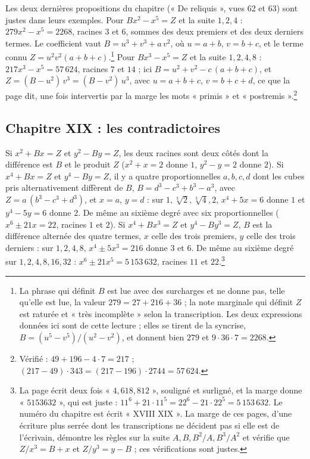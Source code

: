 \documentclass[11pt,a4paper]{article}
\begin{document}
Les deux dernières propositions du chapitre (« De reliquis », vues 62 et 63)
sont justes dans leurs exemples. Pour $Bx^2 - x^5 = Z$ et la suite $1, 2, 4$ :
$279x^2 - x^5 = 2268$, racines $3$ et $6$, sommes des deux premiers et des deux
derniers termes. Le coefficient vaut $B = u^3 + v^3 + a\,v^2$, où $u = a + b$,
$v = b + c$, et le terme connu $Z = u^2v^2(a + b + c)$.\footnote{La phrase qui
définit $B$ est lue avec des surcharges et ne donne pas, telle qu'elle est lue,
la valeur $279 = 27 + 216 + 36$ ; la note marginale qui définit $Z$ est raturée
et « très incomplète » selon la transcription. Les deux expressions données ici
sont de cette lecture ; elles se tirent de la syncrise,
$B = (u^5 - v^5)/(u^2 - v^2)$, et donnent bien $279$ et $9 \cdot 36 \cdot 7 = 2268$.}
Pour $Bx^3 - x^5 = Z$ et la suite $1, 2, 4, 8$ : $217x^3 - x^5 = 57\,624$, racines
$7$ et $14$ ; ici $B = u^2 + v^2 - c\,(a + b + c)$, et $Z = (B - u^2)\,v^3 =
(B - v^2)\,u^3$, avec $u = a + b + c$, $v = b + c + d$, ce que la page dit, une fois
intervertis par la marge les mots « primis » et « postremis ».\footnote{Vérifié :
$49 + 196 - 4 \cdot 7 = 217$ ; $(217 - 49) \cdot 343 = (217 - 196) \cdot 2744 =
57\,624$.}

\subsection*{Chapitre XIX : les contradictoires}

Si $x^2 + Bx = Z$ et $y^2 - By = Z$, les deux racines sont deux côtés dont la
différence est $B$ et le produit $Z$ ($x^2 + x = 2$ donne $1$, $y^2 - y = 2$
donne $2$). Si $x^4 + Bx = Z$ et $y^4 - By = Z$, il y a quatre proportionnelles
$a, b, c, d$ dont les cubes pris alternativement diffèrent de $B$,
$B = d^3 - c^3 + b^3 - a^3$, avec $Z = a\,(b^3 - c^3 + d^3)$, et $x = a$, $y = d$ :
sur $1, \sqrt[3]{2}, \sqrt[3]{4}, 2$, $x^4 + 5x = 6$ donne $1$ et $y^4 - 5y = 6$
donne $2$. De même au sixième degré avec six proportionnelles
($x^6 \pm 21x = 22$, racines $1$ et $2$). Si $x^4 + Bx^3 = Z$ et $y^4 - By^3 = Z$,
$B$ est la différence alternée des quatre termes, $x$ celle des trois premiers,
$y$ celle des trois derniers : sur $1, 2, 4, 8$, $x^4 \pm 5x^3 = 216$ donne $3$
et $6$. De même au sixième degré sur $1, 2, 4, 8, 16, 32$ : $x^6 \pm 21x^5 =
5\,153\,632$, racines $11$ et $22$.\footnote{La page écrit deux fois
« $4{,}618{,}812$ », souligné et surligné, et la marge donne « $5153632$ », qui est
juste : $11^6 + 21 \cdot 11^5 = 22^6 - 21 \cdot 22^5 = 5\,153\,632$. Le numéro du
chapitre est écrit « XVIII XIX ». La marge de ces pages, d'une écriture plus
serrée dont les transcriptions ne décident pas si elle est de l'écrivain,
démontre les règles sur la suite $A, B, B^2/A, B^3/A^2$ et vérifie que
$Z/x^3 = B + x$ et $Z/y^3 = y - B$ ; ces vérifications sont justes.}
\end{document}
